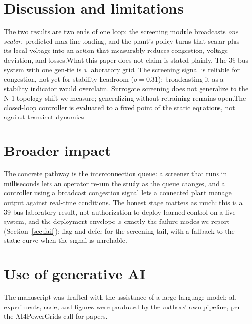 \documentclass{article}
\begin{document}
\section{Discussion and limitations}
\enlargethispage{6\baselineskip}
The two results are two ends of one loop: the screening module broadcasts
\emph{one scalar}, predicted max line loading, and the plant's policy turns
that scalar plus its local voltage into an action that measurably reduces
congestion, voltage deviation, and losses.What this paper does not claim is stated plainly.
The 39-bus system with one gen-tie is a laboratory grid. The screening
signal is reliable for congestion, not yet for stability headroom
($\rho=0.31$); broadcasting it as a stability indicator would overclaim.
Surrogate screening does not generalize to the N-1 topology shift we
measure; generalizing without retraining remains open.The closed-loop controller is evaluated to a fixed point of the static
equations, not against transient dynamics.

\section{Broader impact}

The concrete pathway is the interconnection queue: a screener that runs in
milliseconds lets an operator re-run the study as the queue changes, and a
controller using a broadcast congestion signal lets a connected plant
manage output against real-time conditions.
The honest stage matters as much: this is a 39-bus laboratory result, not
authorization to deploy learned control on a live system, and the
deployment envelope is exactly the failure modes we report
(Section~\ref{sec:fail}): flag-and-defer for the screening tail, with a
fallback to the static curve when the signal is unreliable.

\vspace{-0.7em}
\section*{Use of generative AI}
The manuscript was drafted with the assistance of a large language model;
all experiments, code, and figures were produced by the authors' own
pipeline, per the AI4PowerGrids call for papers.
\end{document}
